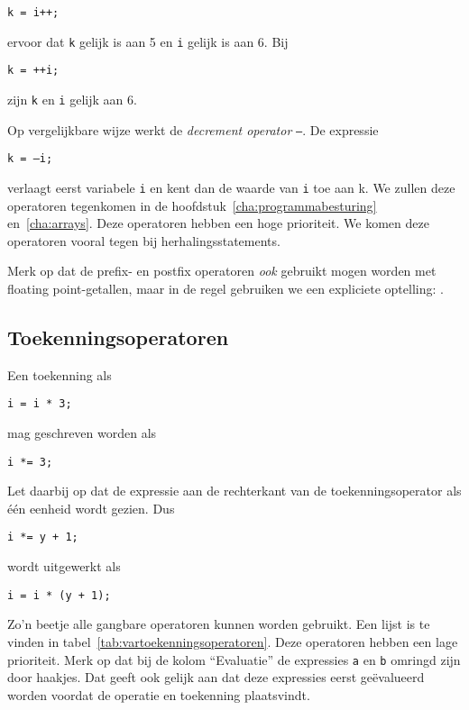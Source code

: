 \hspace*{1em}\texttt{k = i++;}

ervoor dat \texttt{k} gelijk is aan 5 en \texttt{i} gelijk is aan 6. Bij

\hspace*{1em}\texttt{k = ++i;}

zijn \texttt{k} en \texttt{i} gelijk aan 6.

Op vergelijkbare wijze werkt de \textsl{decrement operator} \texttt{--}\indexop{--}. De expressie

\hspace*{1em}\texttt{k = --i;}

verlaagt eerst variabele \texttt{i} en kent dan de waarde van \texttt{i} toe aan k. We zullen deze operatoren tegenkomen in de hoofdstuk~\ref{cha:programmabesturing} en~\ref{cha:arrays}. Deze operatoren hebben een hoge prioriteit. We komen deze operatoren vooral tegen bij herhalingsstatements.

Merk op dat de prefix- en postfix operatoren \textsl{ook} gebruikt mogen worden met floating point-getallen, maar in de regel gebruiken we een expliciete optelling: .

\subsection{Toekenningsoperatoren}
Een toekenning als

\hspace*{1em}\texttt{i = i * 3;}

mag geschreven worden als

\hspace*{1em}\texttt{i *= 3;}

Let daarbij op dat de expressie aan de rechterkant van de toekenningsoperator als één eenheid wordt gezien. Dus

\hspace*{1em}\texttt{i *= y + 1;}

wordt uitgewerkt als

\hspace*{1em}\texttt{i = i * (y + 1);}

Zo'n beetje alle gangbare operatoren kunnen worden gebruikt. Een lijst is te vinden in tabel~\ref{tab:vartoekenningsoperatoren}. Deze operatoren hebben een lage prioriteit. Merk op dat bij de kolom ``Evaluatie'' de expressies \texttt{a} en \texttt{b} omringd zijn door haakjes. Dat geeft ook gelijk aan dat deze expressies eerst geëvalueerd worden voordat de operatie en toekenning plaatsvindt.

